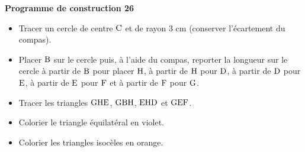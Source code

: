\documentclass[exercice,a4]{thedocument}%
\begin{document}
%
\noindent\textbf{Programme de construction 26}\par\smallskip\noindent
\begin{itemize}
    \item Tracer un cercle de centre $\text{C}$ et de rayon
    $3\text{ cm}$ (conserver l'écartement du compas).
    \item Placer $\text{B}$ sur le cercle puis, à l'aide du compas,
    reporter la longueur sur le cercle à partir de $\text{B}$ pour
    placer $\text{H}$, à partir de $\text{H}$ pour
    $\text{D}$, à partir de $\text{D}$ pour
    $\text{E}$, à partir de $\text{E}$ pour
    $\text{F}$ et à partir de $\text{F}$ pour
    $\text{G}$.
    \item Tracer les triangles $\text{GHE}$, $\text{GBH}$,
    $\text{EHD}$ et $\text{GEF}$.
    \item Colorier le triangle équilatéral en violet.
    \item Colorier les triangles isocèles en orange.
\end{itemize}
\end{document}

